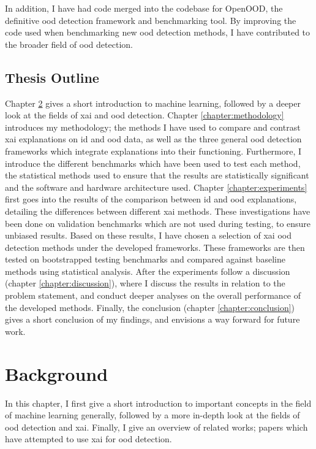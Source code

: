 \documentclass[UKenglish]{uiomasterthesis} %
\theoremstyle{definition}
\begin{document}
In addition, I have had code merged into the codebase for OpenOOD, the definitive \ac{ood} detection framework and benchmarking tool. By improving the code used when benchmarking new \ac{ood} detection methods, I have contributed to the broader field of \ac{ood} detection.

\section{Thesis Outline}

Chapter \ref{chapter:background} gives a short introduction to machine learning, followed by a deeper look at the fields of \ac{xai} and \ac{ood} detection. Chapter \ref{chapter:methodology} introduces my methodology; the methods I have used to compare and contrast \ac{xai} explanations on \ac{id} and \ac{ood} data, as well as the three general \ac{ood} detection frameworks which integrate explanations into their functioning. Furthermore, I introduce the different benchmarks which have been used to test each method, the statistical methods used to ensure that the results are statistically significant and the software and hardware architecture used. Chapter \ref{chapter:experiments} first goes into the results of the comparison between \ac{id} and \ac{ood} explanations, detailing the differences between different \ac{xai} methods. These investigations have been done on validation benchmarks which are not used during testing, to ensure unbiased results. Based on these results, I have chosen a selection of \ac{xai} \ac{ood} detection methods under the developed frameworks. These frameworks are then tested on bootstrapped testing benchmarks and compared against baseline methods using statistical analysis. After the experiments follow a discussion (chapter \ref{chapter:discussion}), where I discuss the results in relation to the problem statement, and conduct deeper analyses on the overall performance of the developed methods. Finally, the conclusion (chapter \ref{chapter:conclusion}) gives a short conclusion of my findings, and envisions a way forward for future work.

\chapter{Background} \label{chapter:background}

In this chapter, I first give a short introduction to important concepts in the field of machine learning generally, followed by a more in-depth look at the fields of \ac{ood} detection and \ac{xai}. Finally, I give an overview of related works; papers which have attempted to use \ac{xai} for \ac{ood} detection.
\end{document}

